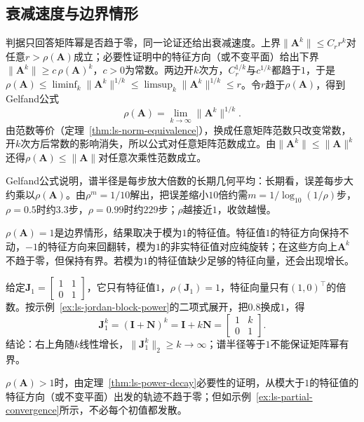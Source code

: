\subsection{衰减速度与边界情形}

判据只回答矩阵幂是否趋于零，同一论证还给出衰减速度。上界$\lVert\bm A^k\rVert\leq C_rr^k$对任意$r>\rho(\bm A)$成立；必要性证明中的特征方向（或不变平面）给出下界$\lVert\bm A^k\rVert\geq c\,\rho(\bm A)^k$，$c>0$为常数。两边开$k$次方，$C_r^{1/k}$与$c^{1/k}$都趋于$1$，于是$\rho(\bm A)\leq\liminf_k\lVert\bm A^k\rVert^{1/k}\leq\limsup_k\lVert\bm A^k\rVert^{1/k}\leq r$。令$r$趋于$\rho(\bm A)$，得到Gelfand公式
\begin{equation}
 \rho(\bm A)=\lim_{k\to\infty}\lVert\bm A^k\rVert^{1/k}.
 \label{eq:ls-gelfand-formula}
\end{equation}
由范数等价（定理~\ref{thm:ls-norm-equivalence}），换成任意矩阵范数只改变常数，开$k$次方后常数的影响消失，所以公式对任意矩阵范数成立。由$\lVert\bm A^k\rVert\leq\lVert\bm A\rVert^k$还得$\rho(\bm A)\leq\lVert\bm A\rVert$对任意次乘性范数成立。

Gelfand公式说明，谱半径是每步放大倍数的长期几何平均：长期看，误差每步大约乘以$\rho(\bm A)$。由$\rho^m=1/10$解出，把误差缩小$10$倍约需$m=1/\log_{10}(1/\rho)$步，$\rho=0.5$时约$3.3$步，$\rho=0.99$时约$229$步；$\rho$越接近$1$，收敛越慢。

$\rho(\bm A)=1$是边界情形，结果取决于模为$1$的特征值。特征值$1$的特征方向保持不动，$-1$的特征方向来回翻转，模为$1$的非实特征值对应纯旋转；在这些方向上$\bm A^k$不趋于零，但保持有界。若模为$1$的特征值缺少足够的特征向量，还会出现增长。
\begin{example}
\label{ex:ls-unit-spectral-radius-growth}
给定$\bm J_1=\left[\begin{smallmatrix}1&1\\0&1\end{smallmatrix}\right]$，它只有特征值$1$，$\rho(\bm J_1)=1$，特征向量只有$(1,0)^\top$的倍数。按示例~\ref{ex:ls-jordan-block-power}的二项式展开，把$0.8$换成$1$，得
\[
 \bm J_1^k=(\bm I+\bm N)^k=\bm I+k\bm N=\begin{bmatrix}1&k\\0&1\end{bmatrix}.
\]
结论：右上角随$k$线性增长，$\lVert\bm J_1^k\rVert_2\geq k\to\infty$；谱半径等于$1$不能保证矩阵幂有界。
\end{example}
$\rho(\bm A)>1$时，由定理~\ref{thm:ls-power-decay}必要性的证明，从模大于$1$的特征值的特征方向（或不变平面）出发的轨迹不趋于零；但如示例~\ref{ex:ls-partial-convergence}所示，不必每个初值都发散。

